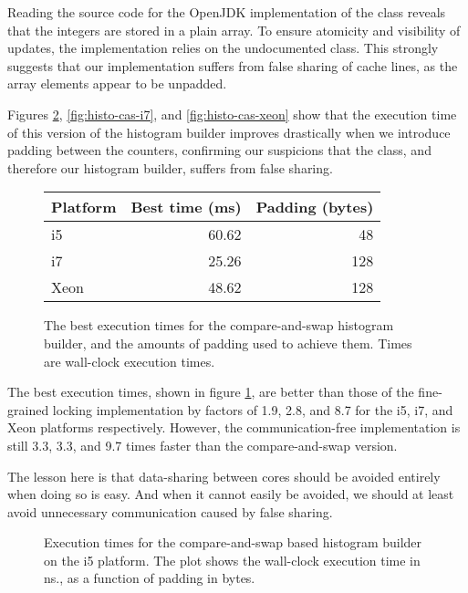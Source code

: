 Reading the source code for the OpenJDK implementation of the
 class \cite{atomicinterarraysrc} reveals that
the integers are stored in a plain  array.
To ensure atomicity and visibility of updates, the implementation relies on the
undocumented  class. This strongly suggests that our
implementation suffers from false sharing of cache lines, as the array elements
appear to be unpadded.

Figures \ref{fig:histo-cas-i5}, \ref{fig:histo-cas-i7}, and
\ref{fig:histo-cas-xeon} show that the execution time of this version of the
histogram builder improves drastically when we introduce padding between the
counters, confirming our suspicions that the  class,
and therefore our histogram builder, suffers from false sharing.

\begin{figure}[hbtp]
	\centering
	\begin{tabular}{l r r}
		\hline
		\hline
		Platform & Best time (ms) & Padding (bytes)\\
		\hline
		i5 & 60.62 & 48 \\
		i7 & 25.26 & 128 \\
		Xeon & 48.62 & 128 \\
		\hline
		\hline
	\end{tabular}
	\caption{The best execution times for the compare-and-swap histogram
	builder, and the amounts of padding used to achieve them. Times
	are wall-clock execution times.}
	\label{table:histo-cas}
\end{figure}

The best execution times, shown in figure \ref{table:histo-cas}, are 
better than those of the fine-grained locking implementation by factors of 1.9,
2.8, and 8.7 for the i5, i7, and Xeon platforms respectively. However, the
communication-free implementation is still 3.3, 3.3, and 9.7 times faster than
the compare-and-swap version.

The lesson here is that data-sharing between cores should be avoided
entirely when doing so is easy. And when it cannot easily be avoided, we
should at least avoid unnecessary communication caused by false sharing.

\begin{figure}[hbpt]
\graphicspath{{plots/}}

\caption{Execution times for the compare-and-swap based histogram builder on the i5 platform. The plot shows the
	wall-clock execution time in ns., as a function of padding in bytes.}
\label{fig:histo-cas-i5}
\end{figure}

